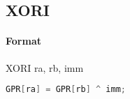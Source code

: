 \subsection{XORI}


\paragraph{Format} XORI ra, rb, imm

\begin{lstlisting}[language=C]
    GPR[ra] = GPR[rb] ^ imm;
\end{lstlisting}